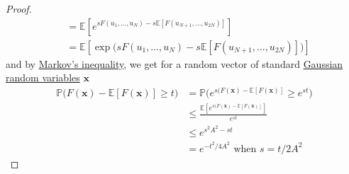 \begin{proof}
\begin{align*}
      & = \mathbb{E}[e^{s F(u_1, \ldots, u_N) -s \mathbb{E}[F(u_{N+1}, \ldots, u_{2N})]}] \\
      & = \mathbb{E}[\exp \big( s F(u_1, \ldots, u_N) -s \mathbb{E}[F(u_{N+1}, \ldots, u_{2N})] \big) ]
  \end{align*}
  and by \hyperref[thm:markovs-inequality]{Markov's inequality}, we get for a random vector of standard \hyperref[prob-def:gaussian-random-variable]{Gaussian random variables} $\mathbf{x}$
  \begin{align*}
      \mathbb{P} \big( F(\mathbf{x}) - \mathbb{E}[F(\mathbf{x})] \geq t) & = \mathbb{P} \big( e^{s( F(\mathbf{x}) - \mathbb{E}[F(\mathbf{x})]} \geq e^{st} \big) \\
      & \leq \frac{\mathbb{E}[e^{s( F(\mathbf{x}) - \mathbb{E}[F(\mathbf{x})]}]}{e^{st}} \\
      & \leq e^{s^2 A^2 - st} \\
      & = e^{- t^2 / 4A^2} \text{ when } s = t / 2A^2
  \end{align*}
  \end{proof}

